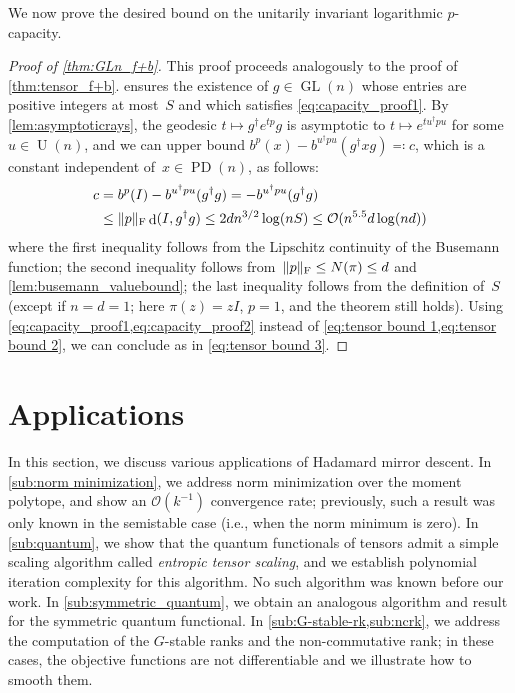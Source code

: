 \documentclass[11pt,letterpaper]{article}
\numberwithin{equation}{section}
\DeclareMathOperator{\PD}{PD}
\DeclareMathOperator{\U}{U}
\DeclareMathOperator{\dist}{d}
\DeclareMathOperator{\GL}{GL}
\DeclarePairedDelimiter\norm{\lVert}{\rVert}
\begin{document}
We now prove the desired bound on the unitarily invariant logarithmic $p$-capacity.

\begin{proof}[Proof of \cref{thm:GLn_f+b}]
    This proof proceeds analogously to the proof of \cref{thm:tensor_f+b}.
     ensures the existence of $g \in \GL(n)$ whose entries are positive integers at most~$S$ and which satisfies \cref{eq:capacity_proof1}.
    By \cref{lem:asymptoticrays}, the geodesic $t \mapsto g^\dagger e^{tp}g$ is asymptotic to $t \mapsto e^{tu^\dagger pu}$ for some $u \in \U(n)$, and we can upper bound $b^p(x) - b^{u^\dagger pu}(g^\dagger xg) \eqqcolon c$, which is a constant independent of~$x\in\PD(n)$, as follows:
    \begin{align}
    \nonumber
        c
    &= b^p(I) - b^{u^\dagger pu}(g^\dagger g)
    = - b^{u^\dagger pu}(g^\dagger g) \\
    \label{eq:capacity_proof2}
    &\leq \norm p_{\mathrm F} \dist(I, g^\dagger g)
    \leq 2 d n^{3/2}\log (nS)
    \leq \mathcal{O}(n^{5.5}d\log(nd))
    \end{align}
    where the first inequality follows from the Lipschitz continuity of the Busemann function;
    the second inequality follows from~$\norm p_{\mathrm F} \leq N(\pi) \leq d$ and \cref{lem:busemann_valuebound};
    the last inequality follows from the definition of~$S$
    (except if $n=d=1$; here $\pi(z)=z I$, $p=1$, and the theorem still holds).
    Using \cref{eq:capacity_proof1,eq:capacity_proof2} instead of \cref{eq:tensor bound 1,eq:tensor bound 2}, we can conclude as in \cref{eq:tensor bound 3}.
\end{proof}

\section{Applications}\label{sec:applications}
In this section, we discuss various applications of Hadamard mirror descent.
In \cref{sub:norm minimization}, we address norm minimization over the moment polytope, and show an $\mathcal{O}(k^{-1})$ convergence rate; previously, such a result was only known in the semistable case (i.e., when the norm minimum is zero).
In \cref{sub:quantum}, we show that the quantum functionals of tensors admit a simple scaling algorithm called \emph{entropic tensor scaling}, and we establish polynomial iteration complexity for this algorithm.
No such algorithm was known before our work.
In \cref{sub:symmetric_quantum}, we obtain an analogous algorithm and result for the symmetric quantum functional.
In \cref{sub:G-stable-rk,sub:ncrk}, we address the computation of the $G$-stable ranks and the non-commutative rank; in these cases, the objective functions are not differentiable and we illustrate how to smooth them.
\end{document}
